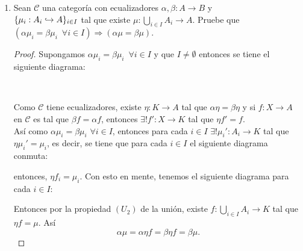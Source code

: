 \documentclass{article}
\begin{document}
\begin{enumerate}[label=\textbf{Ej \arabic*.}]
\begin{proof}
			Así $\forall x\in \displaystyle\sum_{i\in I}Im(\alpha_i)$ se tiene que 
			\begin{gather*}
				\mu g(x)=\mu \left(\sum_{k=0}^nf'_{i_k}(x_k)\right)
				=\sum_{k=0}^n\mu f'_{i_k}(x_k)\\
				=\sum_{k=0}^n f\alpha_{i_k}(x_k)
				=f\left(\sum_{k=0}^n\alpha_{i_k}(x_k)\right)\\
				=f\nu(x).
			\end{gather*}
			Por lo tanto $\displaystyle\sum_{i\in I}Im(\alpha_i)$ es la unión categorica.
			
		\end{proof}
		\item Sean $\mathscr{C}$ una categoría con ecualizadores $\alpha,\beta\colon A\to B$ y \\ $\{\mu_i\catarrow{}{A_i}{A}{m}\}_{i\in I}$ tal que 
		existe $\mu:\displaystyle\bigcup_{i\in I}A_i\longrightarrow A.$ Pruebe que \\ $\left(\alpha\mu_i=\beta\mu_i\,\,\,\forall i\in I\right)\Rightarrow
		\left(\alpha\mu=\beta\mu\right).$
		\begin{proof}
			
			Supongamos $\alpha\mu_i=\beta\mu_i\,\,\,\forall i\in I$ y que $I\neq \emptyset$ entonces se tiene el siguiente diagrama:
			\\
			\centerline{
				\,
			}
			Como $\mathscr{C}$ tiene ecualizadores, existe $\eta:K\to A$ tal que $\alpha\eta=\beta\eta$ y si $f:X\to A$ en $\mathscr{C}$ es tal que
			$\beta f=\alpha f$, entonces $\exists ! f':X\to K$ tal que $\eta f'=f$. \\
			
			Así como $\alpha\mu_i=\beta\mu_i\,\,\forall i\in I$, entonces para cada $i\in I$ $\exists ! \mu_i':A_i\to K$ tal que $\eta\mu_i'=\mu_i$, es decir, se tiene que 
			para cada $i\in I$ el siguiente diagrama conmuta:
			
			\centerline{
				}
			entonces, $\eta f_i=\mu_i$. Con esto en mente, tenemos el siguiente diagrama para cada $i\in I$:			
			\begin{center}
			\end{center}
			Entonces por la propiedad $(U_2)$ de la unión, existe $f:\displaystyle\bigcup_{i\in I}A_i\longrightarrow K$ tal que $\eta f=\mu$. Así 
			\[\alpha\mu=\alpha\eta f=\beta \eta f=\beta\mu.\]
			

\end{proof}
\end{enumerate}
\end{document}
